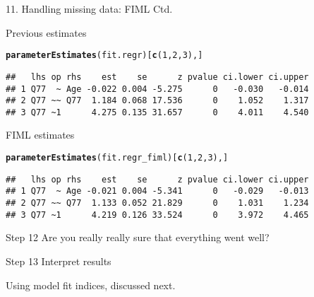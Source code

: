 \documentclass[10pt]{beamer}\usepackage[]{graphicx}\usepackage[]{xcolor}
\makeatletter
\newcommand{\hlnum}[1]{\textcolor[rgb]{0.686,0.059,0.569}{#1}}%
\newcommand{\hlstd}[1]{\textcolor[rgb]{0.345,0.345,0.345}{#1}}%
\newcommand{\hlkwd}[1]{\textcolor[rgb]{0.737,0.353,0.396}{\textbf{#1}}}%
\newenvironment{kframe}{%
 \def\at@end@of@kframe{}%
 \ifinner\ifhmode%
  \def\at@end@of@kframe{\end{minipage}}%
  \begin{minipage}{\columnwidth}%
 \fi\fi%
 \def\FrameCommand##1{\hskip\@totalleftmargin \hskip-\fboxsep
 \colorbox{shadecolor}{##1}\hskip-\fboxsep
     \hskip-\linewidth \hskip-\@totalleftmargin \hskip\columnwidth}%
 \MakeFramed {\advance\hsize-\width
   \@totalleftmargin\z@ \linewidth\hsize
   \@setminipage}}%
 {\par\unskip\endMakeFramed%
 \at@end@of@kframe}
\newenvironment{knitrout}{}{} %
\makeatother
\begin{document}
%
\begin{frame}[fragile]{11. Handling missing data: FIML Ctd.}

Previous estimates 
\begin{knitrout}
\color{fgcolor}\begin{kframe}
\begin{alltt}
\hlkwd{parameterEstimates}\hlstd{(fit.regr)[}\hlkwd{c}\hlstd{(}\hlnum{1}\hlstd{,}\hlnum{2}\hlstd{,}\hlnum{3}\hlstd{),]}
\end{alltt}
\begin{verbatim}
##   lhs op rhs    est    se      z pvalue ci.lower ci.upper
## 1 Q77  ~ Age -0.022 0.004 -5.275      0   -0.030   -0.014
## 2 Q77 ~~ Q77  1.184 0.068 17.536      0    1.052    1.317
## 3 Q77 ~1      4.275 0.135 31.657      0    4.011    4.540
\end{verbatim}
\end{kframe}
\end{knitrout}

FIML estimates
\begin{knitrout}
\color{fgcolor}\begin{kframe}
\begin{alltt}
\hlkwd{parameterEstimates}\hlstd{(fit.regr_fiml)[}\hlkwd{c}\hlstd{(}\hlnum{1}\hlstd{,}\hlnum{2}\hlstd{,}\hlnum{3}\hlstd{),]}
\end{alltt}
\begin{verbatim}
##   lhs op rhs    est    se      z pvalue ci.lower ci.upper
## 1 Q77  ~ Age -0.021 0.004 -5.341      0   -0.029   -0.013
## 2 Q77 ~~ Q77  1.133 0.052 21.829      0    1.031    1.234
## 3 Q77 ~1      4.219 0.126 33.524      0    3.972    4.465
\end{verbatim}
\end{kframe}
\end{knitrout}

\end{frame}
%
\begin{frame}{Step 12}
\Large Are you really really sure that everything went well?
\end{frame}
%
\begin{frame}{Step 13}
\Large{Interpret results}

\vspace{5mm}

\normalsize{Using model fit indices, discussed next.}

\end{frame}
%
\end{document}
